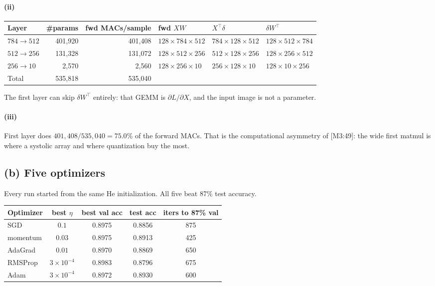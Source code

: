 \documentclass[11pt]{article}
\begin{document}
\paragraph{(ii)}
{\small
\begin{center}
\begin{tabular}{lrrlll}
\toprule
Layer & \#params & fwd MACs/sample & fwd \(XW\) & \(X^\top\delta\) & \(\delta W^\top\) \\
\midrule
\(784\to 512\) & 401{,}920 & 401{,}408 & \(128\times 784\times 512\) & \(784\times 128\times 512\) & \(128\times 512\times 784\) \\
\(512\to 256\) & 131{,}328 & 131{,}072 & \(128\times 512\times 256\) & \(512\times 128\times 256\) & \(128\times 256\times 512\) \\
\(256\to 10\)  & 2{,}570   & 2{,}560   & \(128\times 256\times 10\)  & \(256\times 128\times 10\)  & \(128\times 10\times 256\) \\
\midrule
Total & 535{,}818 & 535{,}040 & & & \\
\bottomrule
\end{tabular}
\end{center}
}
The first layer can skip \(\delta W^\top\) entirely: that GEMM is
\(\partial L/\partial X\), and the input image is not a parameter.

\paragraph{(iii)}
First layer does \(401{,}408/535{,}040=75.0\%\) of the forward MACs.
That is the computational asymmetry of [M3:49]: the wide first matmul
is where a systolic array and where quantization buy the most.

\subsection*{(b) Five optimizers}

Every run started from the same He initialization. All five beat 87\%
test accuracy.
\begin{center}
\begin{tabular}{lcccc}
\toprule
Optimizer & best \(\eta\) & best val acc & test acc & iters to 87\% val \\
\midrule
SGD & \(0.1\) & 0.8975 & 0.8856 & 875 \\
momentum & \(0.03\) & 0.8975 & 0.8913 & 425 \\
AdaGrad & \(0.01\) & 0.8970 & 0.8869 & 650 \\
RMSProp & \(3\times 10^{-4}\) & 0.8983 & 0.8796 & 675 \\
Adam & \(3\times 10^{-4}\) & 0.8972 & 0.8930 & 600 \\
\bottomrule
\end{tabular}
\end{center}
\end{document}
